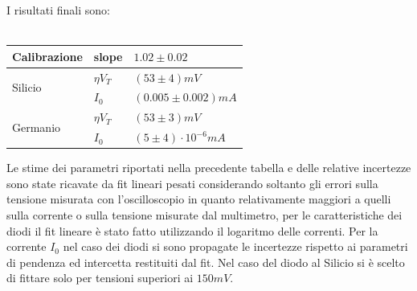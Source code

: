 \documentclass{amsart}
\begin{document}
    I risultati finali sono:\\
    \hfill \\
    \begin{center}
        \begin{tabular}{|p{2cm}|p{1cm}|p{3cm}|}
            \hline
            Calibrazione & slope & $1.02 \pm 0.02$ \\
            \hline
            \multirow{2}{*}{Silicio}      & $\eta V_T$ & $(53 \pm 4)mV$ \\
                                        & $I_0$ & $(0.005 \pm 0.002) mA $ \\
            \hline
            \multirow{2}{*}{Germanio}      & $\eta V_T$ & $(53 \pm 3)mV$ \\
                                        & $I_0$ & $ (5 \pm 4) \cdot 10^{-6} mA$\\
            \hline  
        \end{tabular}
    \end{center}
    \vspace{0.5cm}
    Le stime dei parametri riportati nella precedente tabella e delle relative incertezze sono state ricavate da fit lineari pesati
    considerando soltanto gli errori sulla tensione misurata con l'oscilloscopio in quanto relativamente maggiori 
    a quelli sulla corrente o sulla tensione misurate dal multimetro, per le caratteristiche dei diodi il fit lineare è stato 
    fatto utilizzando il logaritmo delle correnti. Per la corrente $I_0$ nel caso dei diodi si sono propagate le incertezze rispetto
    ai parametri di pendenza ed intercetta restituiti dal fit. Nel caso del diodo al Silicio si è scelto di fittare solo per tensioni
    superiori ai $150mV$.
\end{document}
